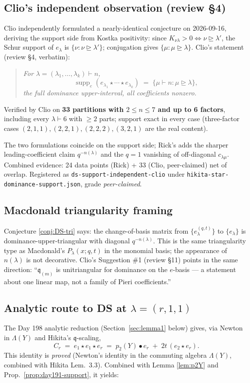 \documentclass[11pt]{article}
\theoremstyle{definition}
\newcommand{\bul}{\bullet}
\newcommand{\qm}{\mathfrak q}
\begin{document}
\subsection*{Clio's independent observation (review \S 4)}
Clio independently formulated a nearly-identical conjecture on
2026-09-16, deriving the support side from Kostka positivity: since
$K_{\nu\lambda}>0\iff \nu\trianglerighteq\lambda'$, the Schur support
of $e_\lambda$ is $\{\nu:\nu\trianglerighteq\lambda'\}$; conjugation
gives $\{\mu:\mu\trianglerighteq\lambda\}$. Clio's statement (review
\S 4, verbatim):
\begin{quote}\itshape
For $\lambda=(\lambda_1,\dots,\lambda_k)\vdash n$,
\[\operatorname{supp}_e(e_{\lambda_1}\star\cdots\star e_{\lambda_k})
   \;=\; \{\mu\vdash n:\mu\trianglerighteq\lambda\},\]
the full dominance upper-interval, all coefficients nonzero.
\end{quote}
Verified by Clio on \textbf{33 partitions with $2\le n\le 7$ and up
to 6 factors}, including every $\lambda\vdash 6$ with $\ge 2$ parts;
support exact in every case (three-factor cases $(2,1,1),(2,2,1),(2,2,2),(3,2,1)$
are the real content).

The two formulations coincide on the support side; Rick's adds the
sharper leading-coefficient claim $q^{-n(\lambda)}$ and the $q=1$
vanishing of off-diagonal $c_{\lambda\mu}$. Combined evidence: 24
data points (Rick) + 33 (Clio, peer-claimed) net of overlap.
Registered as \verb|ds-support-independent-clio| under
\texttt{hikita-star-dominance-support.json}, grade \emph{peer-claimed}.

\subsection*{Macdonald triangularity framing}
Conjecture \ref{conj:DS-tri} says: the change-of-basis matrix from
$\{e_\lambda^{(q,t)}\}$ to $\{e_\lambda\}$ is dominance-upper-triangular
with diagonal $q^{-n(\lambda)}$. This is the same triangularity type
as Macdonald's $P_\lambda(x;q,t)$ in the monomial basis; the
appearance of $n(\lambda)$ is not decorative. Clio's Suggestion \#1
(review \S 11) points in the same direction: ``$\qm_{(m)}$ is
unitriangular for dominance on the $e$-basis --- a statement about
one linear map, not a family of Pieri coefficients.''

\subsection*{Analytic route to DS at $\lambda=(r,1,1)$}
The Day 198 analytic reduction (Section~\ref{sec:lemma1} below)
gives, via Newton in $\Lambda(Y)$ and Hikita's $\qm$-scaling,
\begin{equation}\label{eq:C_r-decomp}
  C_r \;=\; e_1\star e_1\star e_r
       \;=\; p_2(Y)\bul e_r \;+\; 2t\,(e_2\star e_r).
\end{equation}
This identity is \emph{proved} (Newton's identity in the commuting
algebra $\Lambda(Y)$, combined with Hikita Lem.\ 3.3). Combined with
Lemma \ref{lem:p2Y} and Prop.\ \ref{prop:day191-support}, it yields:
\end{document}
